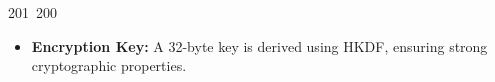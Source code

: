 201~200~\documentclass{article}
\begin{document}
\begin{itemize}
	                                                                                                                                                                                                                                                                                                	                                                                                                                                        	    	                                                                                                	                                                                                                                                                                                                                                                                                                                                	                                                                        	                                                                        	                                                                                                                                        	                                                                                                                                                                                                                        	                                                                                                                            	                                                                	                                                                                                \item \textbf{Encryption Key:} A 32-byte key is derived using HKDF, ensuring strong cryptographic properties.

\end{itemize}
\end{document}
